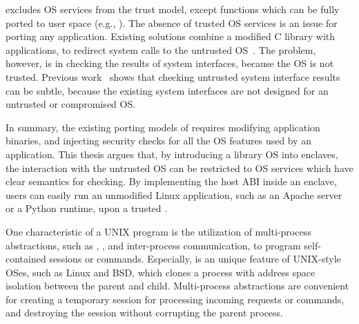 \sgx{} excludes OS services from the trust model, except functions which can be fully ported to user space (e.g., ).
The absence of trusted OS services is an issue for porting any application.
Existing solutions combine a modified C library with applications, to redirect system calls
to the untrusted OS~\cite{osdi16scone,shinde17panoply}.
The problem, however, is in checking the results of system interfaces, because the OS is not trusted. %
Previous work~\cite{checkoway13iago} shows that
checking untrusted system interface results can be subtle, because the existing system interfaces are not designed for an untrusted or compromised OS.


In summary, the existing porting models of \sgx{} requires modifying application binaries, and injecting security checks for all the OS features used by an application.
This thesis argues that, by introducing a library OS into enclaves,
the interaction with the untrusted OS can be restricted to OS services which have clear semantics for checking.
By implementing the host ABI inside an enclave,
users can easily run an unmodified Linux application, such as an Apache server or a Python runtime, upon a trusted \libos{}.



\label{sec:intro:multiproc}


One characteristic of a UNIX program
is the utilization of multi-process abstractions,
such as , ,
and inter-process communication,
to program self-contained sessions or commands.
Especially,  is an unique feature of UNIX-style OSes, such as Linux and BSD,
which clones a process with address space isolation
between the parent and child.
Multi-process abstractions are convenient for creating a temporary session for processing incoming requests or commands, and destroying the session without corrupting the parent process.



